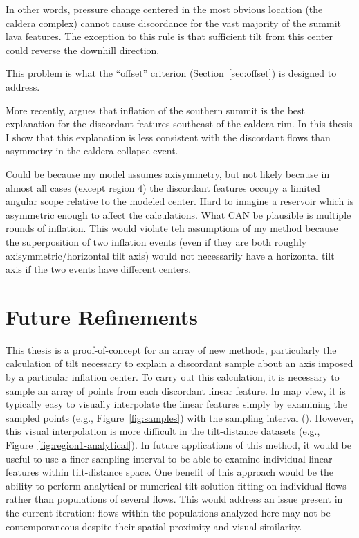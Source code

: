 In other words, pressure change centered in the most obvious location (the caldera complex) cannot cause discordance for the vast majority of the summit lava features. The exception to this rule is that sufficient tilt from this center could reverse the downhill direction.

This problem is what the ``offset'' criterion (Section~\ref{sec:offset}) is designed to address.

More recently, \parencite{mouginis-mark_late-stage_2019} argues that inflation of the southern summit is the best explanation for the discordant features southeast of the caldera rim. In this thesis I show that this explanation is less consistent with the discordant flows than asymmetry in the caldera collapse event. 

Could be because my model assumes axisymmetry, but not likely because in almost all cases (except region 4) the discordant features occupy a limited angular scope relative to the modeled center. Hard to imagine a reservoir which is asymmetric enough to affect the calculations. What CAN be plausible is multiple rounds of inflation. This would violate teh assumptions of my method because the superposition of two inflation events (even if they are both roughly axisymmetric/horizontal tilt axis) would not necessarily have a horizontal tilt axis if the two events have different centers.

\section{Future Refinements}

This thesis is a proof-of-concept for an array of new methods, particularly the calculation of tilt necessary to explain a discordant sample about an axis imposed by a particular inflation center. To carry out this calculation, it is necessary to sample an array of points from each discordant linear feature. In map view, it is typically easy to visually interpolate the linear features simply by examining the sampled points (e.g., Figure~\ref{fig:samples}) with the sampling interval (\samplinginterval). However, this visual interpolation is more difficult in the tilt-distance datasets (e.g., Figure~\ref{fig:region1-analytical}). In future applications of this method, it would be useful to use a finer sampling interval to be able to examine individual linear features within tilt-distance space. One benefit of this approach would be the ability to perform analytical or numerical tilt-solution fitting on individual flows rather than populations of several flows. This would address an issue present in the current iteration: flows within the populations analyzed here may not be contemporaneous despite their spatial proximity and visual similarity.

